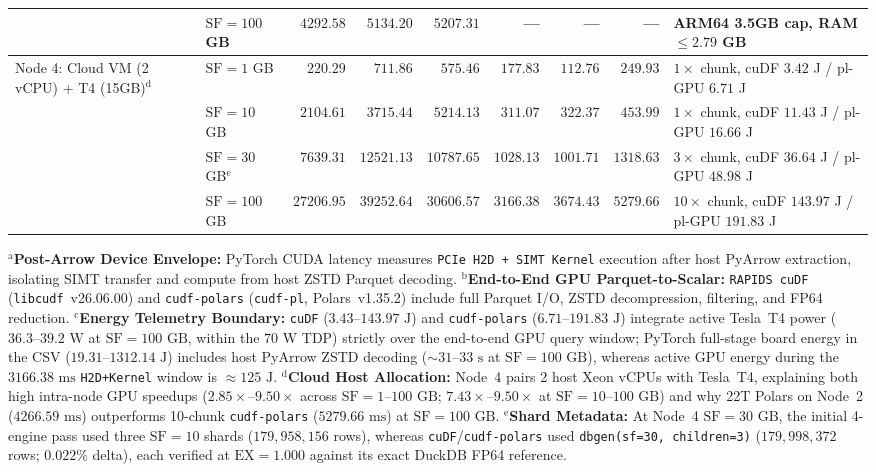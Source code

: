 \documentclass[10pt,a4paper]{article}
\begin{document}
\begin{table}[htbp]
{\begin{tabular}{@{}llrrrrrrl@{}}
 & $\text{SF}=100$ GB & $4292.58$ & $5134.20$ & $5207.31$ & --- & --- & --- & ARM64 3.5GB cap, RAM $\le 2.79$ GB \\
\midrule
Node 4: Cloud VM (2 vCPU) + T4 (15GB)$^{\mathrm{d}}$ & $\text{SF}=1$ GB & $220.29$ & $711.86$ & $575.46$ & $177.83$ & $112.76$ & $249.93$ & $1\times$ chunk, cuDF $3.42$ J / pl-GPU $6.71$ J \\
 & $\text{SF}=10$ GB & $2104.61$ & $3715.44$ & $5214.13$ & $311.07$ & $322.37$ & $453.99$ & $1\times$ chunk, cuDF $11.43$ J / pl-GPU $16.66$ J \\
 & $\text{SF}=30$ GB$^{\mathrm{e}}$ & $7639.31$ & $12521.13$ & $10787.65$ & $1028.13$ & $1001.71$ & $1318.63$ & $3\times$ chunk, cuDF $36.64$ J / pl-GPU $48.98$ J \\
 & $\text{SF}=100$ GB & $27206.95$ & $39252.64$ & $30606.57$ & $3166.38$ & $3674.43$ & $5279.66$ & $10\times$ chunk, cuDF $143.97$ J / pl-GPU $191.83$ J \\
\bottomrule
\end{tabular}%
}
\vspace{3pt}\par{\scriptsize\raggedright $^{\mathrm{a}}$\textbf{Post-Arrow Device Envelope:} PyTorch CUDA latency measures \texttt{PCIe H2D + SIMT Kernel} execution after host PyArrow extraction, isolating SIMT transfer and compute from host ZSTD Parquet decoding. $^{\mathrm{b}}$\textbf{End-to-End GPU Parquet-to-Scalar:} \texttt{RAPIDS cuDF} (\texttt{libcudf}~v26.06.00) and \texttt{cudf-polars} (\texttt{cudf-pl}, Polars~v1.35.2) include full Parquet I/O, ZSTD decompression, filtering, and FP64 reduction. $^{\mathrm{c}}$\textbf{Energy Telemetry Boundary:} \texttt{cuDF} ($3.43\text{--}143.97\text{ J}$) and \texttt{cudf-polars} ($6.71\text{--}191.83\text{ J}$) integrate active Tesla~T4 power ($36.3\text{--}39.2\text{ W}$ at $\text{SF}=100\text{ GB}$, within the $70\text{ W}$ TDP) strictly over the end-to-end GPU query window; PyTorch full-stage board energy in the CSV ($19.31\text{--}1312.14\text{ J}$) includes host PyArrow ZSTD decoding ($\sim 31\text{--}33\text{ s}$ at $\text{SF}=100\text{ GB}$), whereas active GPU energy during the $3166.38\text{ ms}$ \texttt{H2D+Kernel} window is $\approx 125\text{ J}$. $^{\mathrm{d}}$\textbf{Cloud Host Allocation:} Node~4 pairs 2 host Xeon vCPUs with Tesla~T4, explaining both high intra-node GPU speedups ($2.85\times\text{--}9.50\times$ across $\text{SF}=1\text{--}100\text{ GB}$; $7.43\times\text{--}9.50\times$ at $\text{SF}=10\text{--}100\text{ GB}$) and why 22T Polars on Node~2 ($4266.59\text{ ms}$) outperforms 10-chunk \texttt{cudf-polars} ($5279.66\text{ ms}$) at $\text{SF}=100\text{ GB}$. $^{\mathrm{e}}$\textbf{Shard Metadata:} At Node~4 $\text{SF}=30\text{ GB}$, the initial 4-engine pass used three $\text{SF}=10$ shards ($179{,}958{,}156$ rows), whereas \texttt{cuDF}/\texttt{cudf-polars} used \texttt{dbgen(sf=30, children=3)} ($179{,}998{,}372$ rows; $0.022\%$ delta), each verified at $\text{EX}=1.000$ against its exact DuckDB FP64 reference.\par}
\end{table}
\end{document}
